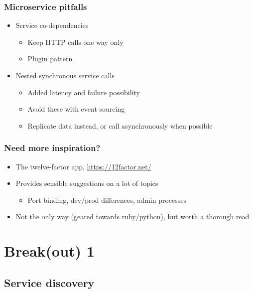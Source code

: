 \documentclass[8pt]{article}
\begin{document}
\subsubsection{Microservice pitfalls}
\label{sec:orgf640e22}
\begin{itemize}
\item Service co-dependencies
\begin{itemize}
\item Keep HTTP calls one way only
\item Plugin pattern
\end{itemize}
\item Nested synchronous service calls
\begin{itemize}
\item Added latency and failure possibility
\item Avoid these with event sourcing
\item Replicate data instead, or call asynchronously when possible
\end{itemize}
\end{itemize}
\subsubsection{Need more inspiration?}
\label{sec:org96b49b7}
\begin{itemize}
\item The twelve-factor app, \href{https://12factor.net/}{https://12factor.net/}
\item Provides sensible suggestions on a lot of topics
\begin{itemize}
\item Port binding, dev/prod differences, admin processes
\end{itemize}
\item Not the only way (geared towards ruby/python), but worth a thorough read
\end{itemize}
\section{Break(out) 1}
\label{sec:org2539385}
\subsection{Service discovery}
\label{sec:orgd63a273}
\end{document}
